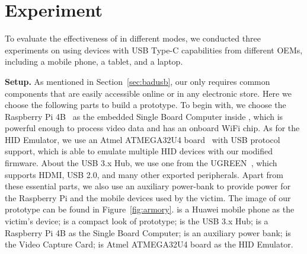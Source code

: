 \section{Experiment}
\label{sec:experiment}


To evaluate the effectiveness of \tool in different modes, we conducted three
experiments on \tool using devices with USB Type-C capabilities from different
OEMs, including a mobile phone, a tablet, and a laptop.

\textbf{Setup.} 
As mentioned in Section~\ref{sec:badusb},
our \tool only requires common components that are easily accessible online or
in any electronic store. Here we choose the following parts to build a
prototype. To begin with, we choose the Raspberry Pi 4B~\cite{pi4b} as the embedded Single Board 
Computer inside \tool, which is powerful enough to process video data and has
an onboard WiFi chip. As for the HID Emulator, we use an Atmel ATMEGA32U4 board~\cite{atmel}
with USB protocol support, which is able to emulate multiple HID devices
with our modified firmware. About the USB 3.x Hub, we use one from the
UGREEN~\cite{ugreen}, which supports HDMI, USB 2.0, and many other exported peripherals.
Apart from these essential parts, we also use an auxiliary power-bank to
provide power for the Raspberry Pi and the mobile devices used by the victim.
The image of our prototype \tool can be found in Figure~\ref{fig:armory}.
 is a Huawei mobile phone as the victim's device;  is a compact look of \tool prototype;  is the USB 3.x Hub;  is a Raspberry Pi 4B as the Single Board Computer;  is an auxiliary power bank;  is the Video Capture Card;  is Atmel ATMEGA32U4 board as the HID Emulator. 


